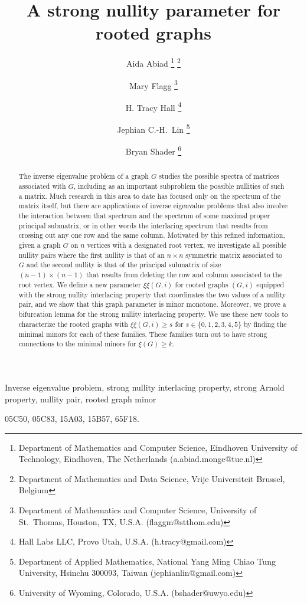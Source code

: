 \documentclass{article}
\title{A strong nullity parameter for rooted graphs}
\author{
Aida Abiad
\thanks{Department of Mathematics and Computer Science, Eindhoven University of Technology, Eindhoven, The Netherlands (a.abiad.monge@tue.nl)}
\thanks{Department of Mathematics and Data Science, Vrije Universiteit Brussel, Belgium}
\and 
Mary Flagg
\thanks{Department of Mathematics and Computer Science, University of St.~Thomas, Houston, TX, U.S.A. (flaggm@stthom.edu)}
\and
H. Tracy Hall
\thanks{Hall Labs LLC, Provo Utah, U.S.A. (h.tracy@gmail.com)}
\and
Jephian C.-H.~Lin
\thanks{Department of Applied Mathematics, National Yang Ming Chiao Tung University, Hsinchu 300093, Taiwan (jephianlin@gmail.com)}
\and 
Bryan Shader
\thanks{University of Wyoming, Colorado, U.S.A. (bshader@uwyo.edu)}
}
\date{}
\theoremstyle{definition}
\newcommand{\excise}{\xi\xi}
\begin{document}
\maketitle

\begin{abstract}
The inverse eigenvalue problem of a graph $G$ studies the possible spectra of matrices associated with $G$, including as an important subproblem the possible nullities of such a matrix.
Much research in this area to date has focused only on the spectrum of the matrix itself, but there are applications of inverse eigenvalue problems that also involve the interaction between that spectrum and the spectrum of some maximal proper principal submatrix, or in other words the interlacing spectrum that results from crossing out any one row and the same column.
Motivated by this refined information, given a graph $G$ on $n$ vertices with a designated root vertex,
we investigate all possible nullity pairs where the first nullity is that of an $n \times n$ symmetric matrix associated to $G$ and the second nullity is that of the principal submatrix of size $(n - 1) \times (n - 1)$ that results from deleting the row and column associated to the root vertex.
We define a new parameter $\excise(G,i)$ for rooted graphs $(G,i)$ equipped with the strong nullity interlacing property that coordinates the two values of a nullity pair, and we show that this graph parameter is minor monotone.
Moreover, we prove a bifurcation lemma for the strong nullity interlacing property.
We use these new tools to characterize the rooted graphs with $\excise(G,i) \geq s$ for $s \in \{ 0,1,2,3,4, 5\}$ by finding the minimal minors for each of these families. These families turn out to have strong connections to the minimal minors for $\xi(G) \geq k$.
\end{abstract}  

Inverse eigenvalue problem, 
strong nullity interlacing property, 
strong Arnold property, 
nullity pair, 
rooted graph minor

\medskip

05C50, %
05C83, %
15A03, %
15B57, %
65F18. %
\end{document}
